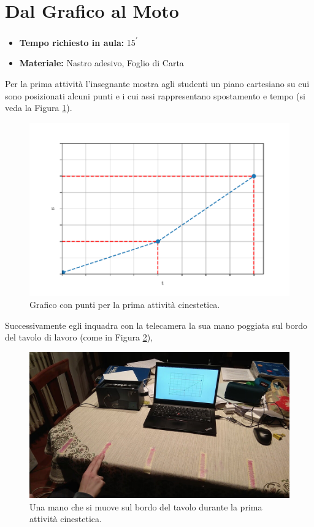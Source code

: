 \documentclass{report} \usepackage[T1]{fontenc} \usepackage[italian]{babel}
\begin{document}
\section{Dal Grafico al Moto}

\begin{itemize}
\item \textbf{Tempo richiesto in aula:} 15\textsuperscript{$\prime$}
\item \textbf{Materiale:} Nastro adesivo, Foglio di Carta
\end{itemize}

Per la prima attività l’insegnante mostra agli studenti un piano cartesiano su
cui sono posizionati alcuni punti e i cui assi rappresentano spostamento e
tempo (si veda la Figura \ref{fig:kine_plot1}).
\begin{figure}[ht]
\centering
  \includegraphics[width=\textwidth]{kine_plot1}
  \caption{Grafico con punti per la prima attività
           cinestetica.}
  \label{fig:kine_plot1}
\end{figure}
Successivamente egli inquadra con la telecamera la sua mano
poggiata sul bordo del tavolo di lavoro (come in  Figura \ref{fig:kine_hand}),
\begin{figure}[H]
\centering
  \includegraphics[width=\textwidth]{kine_hand}
  \caption{Una mano che si muove sul bordo del tavolo durante la
           prima attività cinestetica.}
  \label{fig:kine_hand}
\end{figure}
\end{document}
